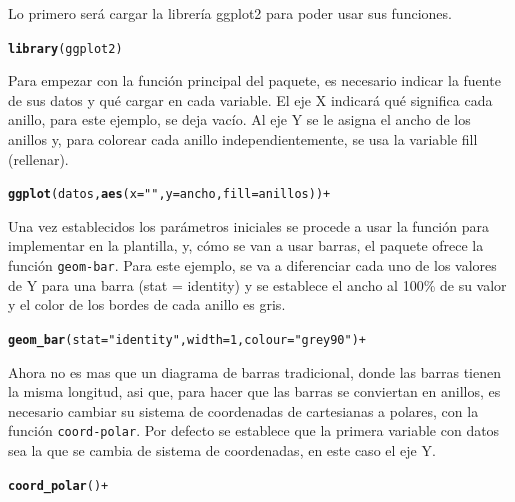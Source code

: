 \documentclass{article}\usepackage[]{graphicx}\usepackage[]{color}
\makeatletter
\newcommand{\hlstr}[1]{\textcolor[rgb]{0.192,0.494,0.8}{#1}}%
\newcommand{\hlstd}[1]{\textcolor[rgb]{0.345,0.345,0.345}{#1}}%
\newcommand{\hlkwd}[1]{\textcolor[rgb]{0.737,0.353,0.396}{\textbf{#1}}}%
\newenvironment{kframe}{%
 \def\at@end@of@kframe{}%
 \ifinner\ifhmode%
  \def\at@end@of@kframe{\end{minipage}}%
  \begin{minipage}{\columnwidth}%
 \fi\fi%
 \def\FrameCommand##1{\hskip\@totalleftmargin \hskip-\fboxsep
 \colorbox{shadecolor}{##1}\hskip-\fboxsep
     \hskip-\linewidth \hskip-\@totalleftmargin \hskip\columnwidth}%
 \MakeFramed {\advance\hsize-\width
   \@totalleftmargin\z@ \linewidth\hsize
   \@setminipage}}%
 {\par\unskip\endMakeFramed%
 \at@end@of@kframe}
\newenvironment{knitrout}{}{} %
\makeatother
\begin{document}
Lo primero ser\'a cargar la librer\'ia ggplot2 para poder usar sus funciones.
\begin{knitrout}
\color{fgcolor}\begin{kframe}
\begin{alltt}
\hlkwd{library}\hlstd{(ggplot2)}
\end{alltt}
\end{kframe}
\end{knitrout}
Para empezar con la funci\'on principal del paquete, es necesario indicar la fuente de sus datos y qu\'e cargar en cada variable. El eje X indicar\'a qu\'e significa cada anillo, para este ejemplo, se deja vac\'io. Al eje Y se le asigna el ancho de los anillos y, para colorear cada anillo independientemente, se usa la variable fill (rellenar).
\begin{knitrout}
\color{fgcolor}\begin{kframe}
\begin{alltt}
\hlkwd{ggplot}(datos, \hlkwd{aes}(x=\hlstr{""}, y=ancho, fill=anillos)) +
\end{alltt}
\end{kframe}
\end{knitrout}
Una vez establecidos los par\'ametros iniciales se procede a usar la funci\'on para implementar en la plantilla, y, c\'omo se van a usar barras, el paquete ofrece la funci\'on \texttt{geom-bar}. Para este ejemplo, se va a diferenciar cada uno de los valores de Y para una barra (stat = identity) y se establece el ancho al 100\% de su valor y el color de los bordes de cada anillo es gris.
\begin{knitrout}
\color{fgcolor}\begin{kframe}
\begin{alltt}
  \hlkwd{geom_bar}(stat=\hlstr{"identity"}, width=1, colour=\hlstr{"grey90"}) +
\end{alltt}
\end{kframe}
\end{knitrout}
\clearpage
Ahora no es mas que un diagrama de barras tradicional, donde las barras tienen la misma longitud, asi que, para hacer que las barras se conviertan en anillos, es necesario cambiar su sistema de coordenadas de cartesianas a polares, con la funci\'on \texttt{coord-polar}. Por defecto se establece que la primera variable con datos sea la que se cambia de sistema de coordenadas, en este caso el eje Y.
\begin{knitrout}
\color{fgcolor}\begin{kframe}
\begin{alltt}
  \hlkwd{coord_polar}() +
\end{alltt}
\end{kframe}
\end{knitrout}
\end{document}
